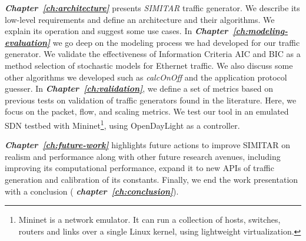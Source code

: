 \textit{\textbf{Chapter~\ref{ch:architecture}}} presents \textit{SIMITAR} traffic generator. We describe its low-level requirements and define an architecture and their algorithms.  We explain its operation and suggest some use cases. In \textit{\textbf{Chapter~\ref{ch:modeling-evaluation}}} we go deep on the modeling process we had developed for our traffic generator. We validate the effectiveness of Information Criteria \acrshort{AIC} and \acrshort{BIC} as a method selection of stochastic models for  Ethernet traffic.  We also discuss some other algorithms we developed such as \textit{calcOnOff} and the application protocol guesser. In \textit{\textbf{Chapter~\ref{ch:validation}}}, we define a set of metrics based on previous tests on validation of traffic generators found in the literature. Here, we focus on the packet, flow, and scaling metrics. We test our tool in an emulated SDN testbed with Mininet\cite{web-mininet}\footnote{Mininet is a network emulator. It can run a collection of  hosts, switches, routers and links over a single Linux kernel, using lightweight virtualization\cite{web-mininet-repo}.}, using OpenDayLight\cite{web-opendaylight} as a controller. 

\textit{\textbf{Chapter~\ref{ch:future-work}}}  highlights future actions to improve SIMITAR on realism and performance along with other future research avenues, including improving its computational performance, expand it to new APIs of traffic generation and calibration of its constants. Finally, we end the work presentation with a conclusion ( \textit{\textbf{chapter~\ref{ch:conclusion}}}).